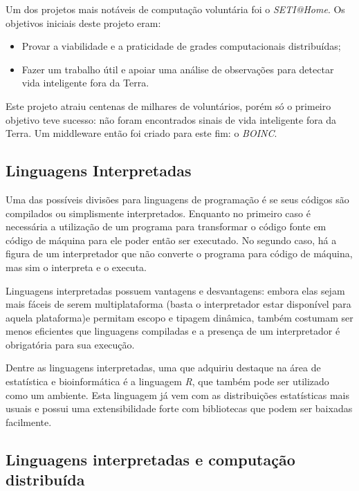 Um dos projetos mais notáveis de computação voluntária foi o \textit{SETI@Home}. Os objetivos iniciais deste projeto eram: 

\begin{itemize}
  \item Provar a viabilidade e a praticidade de grades computacionais distribuídas;
  \item Fazer um trabalho útil e apoiar uma análise de observações para detectar vida inteligente fora da Terra.
\end{itemize}

Este projeto atraiu centenas de milhares de voluntários, porém só o primeiro objetivo teve sucesso: não foram encontrados sinais 
de vida inteligente fora da Terra. Um middleware então foi criado para este fim: o \textit{BOINC}. 

\subsection{Linguagens Interpretadas}


Uma das possíveis divisões para linguagens de programação é se seus códigos são compilados ou simplismente interpretados. Enquanto no primeiro caso
é necessária a utilização de um programa para transformar o código fonte em código de máquina para ele poder então ser executado. No segundo caso,
há a figura de um interpretador que não converte o programa para código de máquina, mas sim o interpreta e o executa. 

Linguagens interpretadas possuem vantagens e desvantagens: embora elas sejam mais fáceis de serem multiplataforma (basta o interpretador
estar disponível para aquela plataforma)e permitam escopo e tipagem dinâmica, também costumam ser menos eficientes que linguagens compiladas e 
a presença de um interpretador é obrigatória para sua execução. 

Dentre as linguagens interpretadas, uma que adquiriu destaque na área de estatística e bioinformática é a linguagem \emph{R}, que também 
pode ser utilizado como um ambiente. Esta linguagem já vem com as distribuições estatísticas mais usuais e possui uma extensibilidade 
forte com bibliotecas que podem ser baixadas facilmente.


\subsection{Linguagens interpretadas e computação distribuída}

